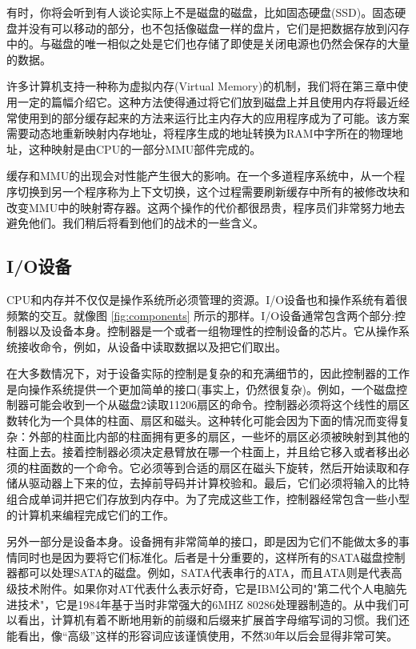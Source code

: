 	有时，你将会听到有人谈论实际上不是磁盘的磁盘，比如固态硬盘(SSD)。固态硬盘并没有可以移动的部分，也不包括像磁盘一样的盘片，它们是把数据存放到闪存中的。与磁盘的唯一相似之处是它们也存储了即使是关闭电源也仍然会保存的大量的数据。
	
	许多计算机支持一种称为虚拟内存(Virtual Memory)的机制，我们将在第三章中使用一定的篇幅介绍它。这种方法使得通过将它们放到磁盘上并且使用内存将最近经常使用到的部分缓存起来的方法来运行比主内存大的应用程序成为了可能。该方案需要动态地重新映射内存地址，将程序生成的地址转换为RAM中字所在的物理地址，这种映射是由CPU的一部分MMU部件完成的。
	
	缓存和MMU的出现会对性能产生很大的影响。在一个多道程序系统中，从一个程序切换到另一个程序称为上下文切换，这个过程需要刷新缓存中所有的被修改块和改变MMU中的映射寄存器。这两个操作的代价都很昂贵，程序员们非常努力地去避免他们。我们稍后将看到他们的战术的一些含义。
	
	\subsection{I/O设备}

	CPU和内存并不仅仅是操作系统所必须管理的资源。I/O设备也和操作系统有着很频繁的交互。就像图 \ref{fig:components} 所示的那样。I/O设备通常包含两个部分:控制器以及设备本身。控制器是一个或者一组物理性的控制设备的芯片。它从操作系统接收命令，例如，从设备中读取数据以及把它们取出。
	
	在大多数情况下，对于设备实际的控制是复杂的和充满细节的，因此控制器的工作是向操作系统提供一个更加简单的接口(事实上，仍然很复杂)。例如，一个磁盘控制器可能会收到一个从磁盘2读取11206扇区的命令。控制器必须将这个线性的扇区数转化为一个具体的柱面、扇区和磁头。这种转化可能会因为下面的情况而变得复杂：外部的柱面比内部的柱面拥有更多的扇区，一些坏的扇区必须被映射到其他的柱面上去。接着控制器必须决定悬臂放在哪一个柱面上，并且给它移入或者移出必须的柱面数的一个命令。它必须等到合适的扇区在磁头下旋转，然后开始读取和存储从驱动器上下来的位，去掉前导码并计算校验和。最后，它们必须将输入的比特组合成单词并把它们存放到内存中。为了完成这些工作，控制器经常包含一些小型的计算机来编程完成它们的工作。
	
	另外一部分是设备本身。设备拥有非常简单的接口，即是因为它们不能做太多的事情同时也是因为要将它们标准化。后者是十分重要的，这样所有的SATA磁盘控制器都可以处理SATA的磁盘。例如，SATA代表串行的ATA，而且ATA则是代表高级技术附件。如果你对AT代表什么表示好奇，它是IBM公司的"第二代个人电脑先进技术"，它是1984年基于当时非常强大的6MHZ 80286处理器制造的。从中我们可以看出，计算机有着不断地用新的前缀和后缀来扩展首字母缩写词的习惯。我们还能看出，像“高级”这样的形容词应该谨慎使用，不然30年以后会显得非常可笑。
	
